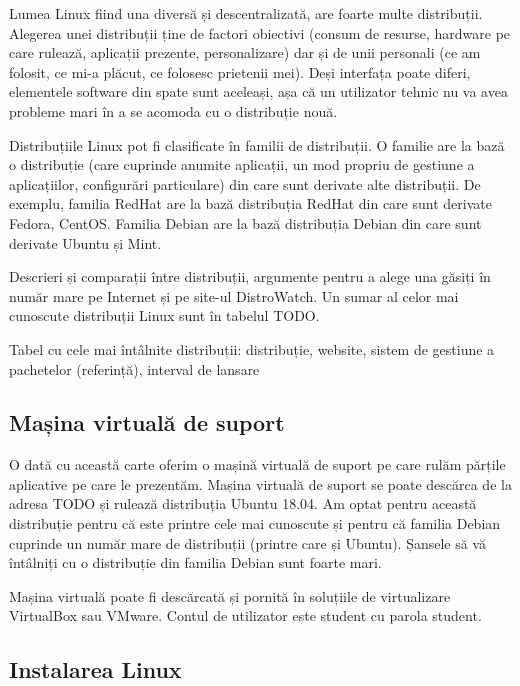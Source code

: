 Lumea Linux fiind una diversă și descentralizată, are foarte multe distribuții.  Alegerea unei distribuții ține de factori obiectivi (consum de resurse, hardware pe care rulează, aplicații prezente, personalizare) dar și de unii personali (ce am folosit, ce mi-a plăcut, ce folosesc prietenii mei). Deși interfața poate diferi, elementele software din spate sunt aceleași, așa că un utilizator tehnic nu va avea probleme mari în a se acomoda cu o distribuție nouă.

Distribuțiile Linux pot fi clasificate în familii de distribuții. O familie are la bază o distribuție (care cuprinde anumite aplicații, un mod propriu de gestiune a aplicațiilor, configurări particulare) din care sunt derivate alte distribuții. De exemplu, familia RedHat are la bază distribuția RedHat din care sunt derivate Fedora, CentOS. Familia Debian are la bază distribuția Debian din care sunt derivate Ubuntu și Mint.

Descrieri și comparații între distribuții, argumente pentru a alege una găsiți în număr mare pe Internet și pe site-ul DistroWatch. Un sumar al celor mai cunoscute distribuții Linux sunt în tabelul TODO.

Tabel cu cele mai întâlnite distribuții: distribuție, website, sistem de gestiune a pachetelor (referință), interval de lansare

\subsection{Mașina virtuală de suport}
\label{sec:intro:vm}

O dată cu această carte oferim o mașină virtuală de suport pe care rulăm părțile aplicative pe care le prezentăm. Mașina virtuală de suport se poate descărca de la adresa TODO și rulează distribuția Ubuntu 18.04. Am optat pentru această distribuție pentru că este printre cele mai cunoscute și pentru că familia Debian cuprinde un număr mare de distribuții (printre care și Ubuntu). Șansele să vă întâlniți cu o distribuție din familia Debian sunt foarte mari.

Mașina virtuală poate fi descărcată și pornită în soluțiile de virtualizare VirtualBox sau VMware. Contul de utilizator este student cu parola student.

\subsection{Instalarea Linux}
\label{sec:intro:linux-install}

